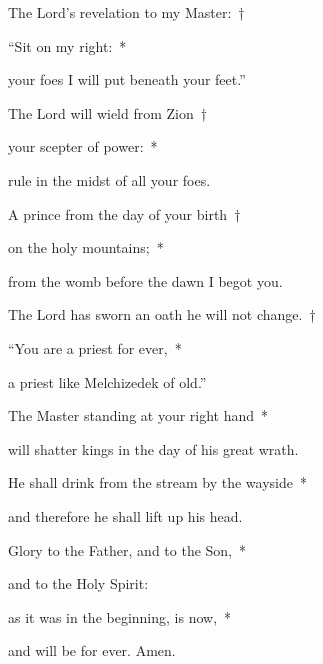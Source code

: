 \noindent The Lord’s revelation to my Master:~†~

“Sit on my right:~*~

your foes I will put beneath your feet.”

\noindent The Lord will wield from Zion~†~

your scepter of power:~*~

rule in the midst of all your foes.

\noindent A prince from the day of your birth~†~

on the holy mountains;~*~

from the womb before the dawn I begot you.

\noindent The Lord has sworn an oath he will not change.~†~

“You are a priest for ever,~*~

a priest like Melchizedek of old.”

\noindent The Master standing at your right hand~*~

will shatter kings in the day of his great wrath.

\noindent He shall drink from the stream by the wayside~*~

and therefore he shall lift up his head.

\noindent Glory to the Father, and to the Son,~*~

and to the Holy Spirit:

\noindent as it was in the beginning, is now,~*~

and will be for ever. Amen.